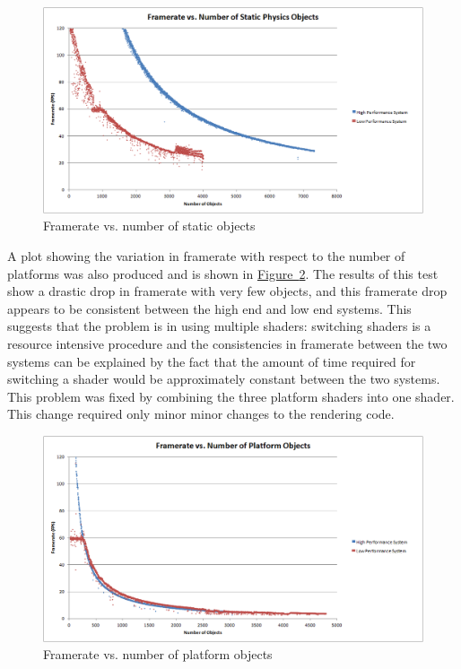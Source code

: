 \documentclass[12pt, titlepage]{article}
\begin{document}
\begin{figure}[h]
\centering
\includegraphics[width=\textwidth]{frameratestatic}
\caption{Framerate vs. number of static objects} \label{fig:frstat}
\end{figure}

A plot showing the variation in framerate with respect to the number of platforms was also produced and is shown in \hyperref[fig:frplat]{Figure~\ref*{fig:frplat}}.  The results of this test show a drastic drop in framerate with very few objects, and this framerate drop appears to be consistent between the high end and low end systems.  This suggests that the problem is in using multiple shaders:  switching shaders is a resource intensive procedure and the consistencies in framerate between the two systems can be explained by the fact that the amount of time required for switching a shader would be approximately constant between the two systems.  This problem was fixed by combining the three platform shaders into one shader.  This change required only minor minor changes to the rendering code.




\begin{figure}[h]
\centering
\includegraphics[width=\textwidth]{framerateplat}
\caption{Framerate vs. number of platform objects} \label{fig:frplat}
\end{figure}
\end{document}
